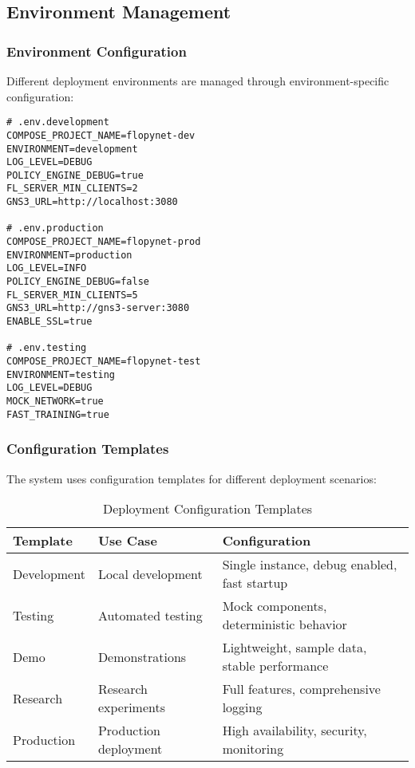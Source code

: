 \subsection{Environment Management}

\subsubsection{Environment Configuration}

Different deployment environments are managed through environment-specific configuration:

\begin{lstlisting}[style=dockercode, caption=Environment Configuration Files]
# .env.development
COMPOSE_PROJECT_NAME=flopynet-dev
ENVIRONMENT=development
LOG_LEVEL=DEBUG
POLICY_ENGINE_DEBUG=true
FL_SERVER_MIN_CLIENTS=2
GNS3_URL=http://localhost:3080

# .env.production
COMPOSE_PROJECT_NAME=flopynet-prod
ENVIRONMENT=production
LOG_LEVEL=INFO
POLICY_ENGINE_DEBUG=false
FL_SERVER_MIN_CLIENTS=5
GNS3_URL=http://gns3-server:3080
ENABLE_SSL=true

# .env.testing
COMPOSE_PROJECT_NAME=flopynet-test
ENVIRONMENT=testing
LOG_LEVEL=DEBUG
MOCK_NETWORK=true
FAST_TRAINING=true
\end{lstlisting}

\subsubsection{Configuration Templates}

The system uses configuration templates for different deployment scenarios:

\begin{table}[H]
\centering
\caption{Deployment Configuration Templates}
\label{tab:deployment-templates}
\begin{tabular}{@{}llp{6cm}@{}}
\toprule
\textbf{Template} & \textbf{Use Case} & \textbf{Configuration} \\
\midrule
Development & Local development & Single instance, debug enabled, fast startup \\
Testing & Automated testing & Mock components, deterministic behavior \\
Demo & Demonstrations & Lightweight, sample data, stable performance \\
Research & Research experiments & Full features, comprehensive logging \\
Production & Production deployment & High availability, security, monitoring \\
\bottomrule
\end{tabular}
\end{table}

